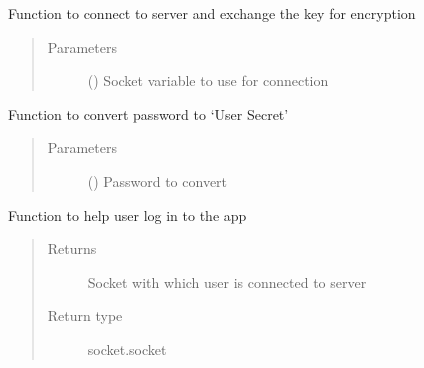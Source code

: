 \documentclass[letterpaper,10pt,english]{sphinxmanual}
\begin{document}
\begin{fulllineitems}
\label{\detokenize{app:app.connectToServer}}
Function to connect to server and exchange the key for encryption
\begin{quote}\begin{description}
\item[{Parameters}] \leavevmode
{} () \textendash{} Socket variable to use for connection

\end{description}\end{quote}

\end{fulllineitems}


\begin{fulllineitems}
\label{\detokenize{app:app.getUserSecretFromPassword}}
Function to convert password to ‘User Secret’
\begin{quote}\begin{description}
\item[{Parameters}] \leavevmode
{} () \textendash{} Password to convert

\end{description}\end{quote}

\end{fulllineitems}


\begin{fulllineitems}
\label{\detokenize{app:app.login}}
Function to help user log in to the app
\begin{quote}\begin{description}
\item[{Returns}] \leavevmode
Socket with which user is connected to server

\item[{Return type}] \leavevmode
socket.socket

\end{description}\end{quote}

\end{fulllineitems}
\end{document}
